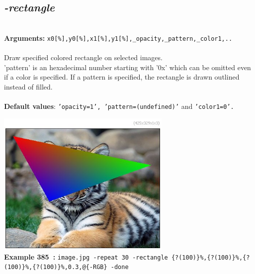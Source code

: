 \documentclass[a4paper,11pt,twoside]{book}
\begin{document}
\subsection{\emph{-rectangle} }\vspace*{-0.5em}
~\\\textbf{Arguments: } 
{\small \texttt{x0[\%],y0[\%],x1[\%],y1[\%],\_opacity,\_pattern,\_color1,..}}\\~\\
Draw specified colored rectangle on selected images.
~\\'pattern' is an hexadecimal number starting with '0x' which can be omitted
even if a color is specified. If a pattern is specified, the rectangle is
drawn outlined instead of filled.
~\\~\\\textbf{Default values}: {\small \texttt{'opacity=1', 'pattern=(undefined)'} and \texttt{'color1=0'.}}
\begin{center}\includegraphics[keepaspectratio=true,height=7cm,width=\textwidth]{img/gmic_def385.jpg}\\
{\footnotesize \textbf{Example 385~:} \texttt{image.jpg -repeat 30 -rectangle \{?(100)\}\%,\{?(100)\}\%,\{?(100)\}\%,\{?(100)\}\%,0.3,@\{-RGB\} -done}}
\end{center}
\end{document}
